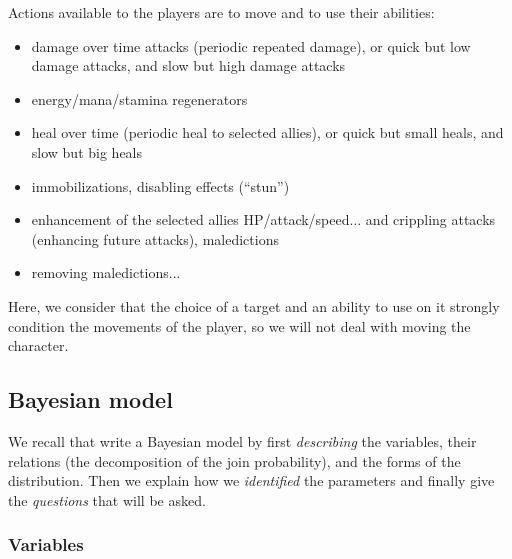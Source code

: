 Actions available to the players are to move and to use their abilities:
\begin{itemize}
    \item damage over time attacks (periodic repeated damage), or quick but low damage attacks, and slow but high damage attacks
    \item energy/mana/stamina regenerators
    \item heal over time (periodic heal to selected allies), or quick but small heals, and slow but big heals
    \item immobilizations, disabling effects (``stun'')
    \item enhancement of the selected allies HP/attack/speed... and crippling attacks (enhancing future attacks), maledictions
    \item removing maledictions...
\end{itemize}

Here, we consider that the choice of a target and an ability to use on it strongly condition the movements of the player, so we will not deal with moving the character.

\subsection{Bayesian model}
We recall that write a Bayesian model by first \textit{describing} the variables, their relations (the decomposition of the join probability), and the forms of the distribution. Then we explain how we \textit{identified} the parameters and finally give the \textit{questions} that will be asked.
\subsubsection{Variables}

